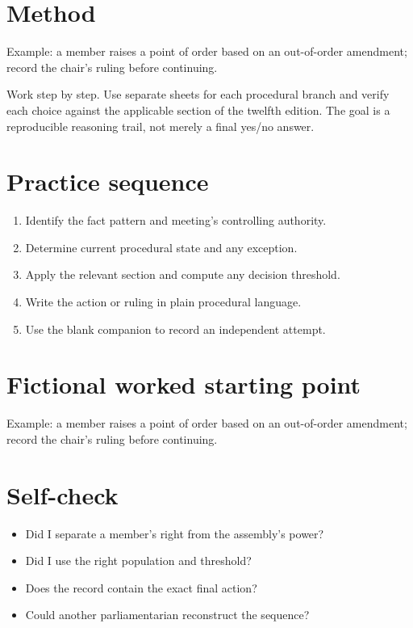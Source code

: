\documentclass[11pt]{article}
\begin{document}
\SuiteOpen
\section{Method}
Example: a member raises a point of order based on an out-of-order amendment; record the chair’s ruling before continuing.

Work step by step. Use separate sheets for each procedural branch and verify each choice against the applicable section of the twelfth edition. The goal is a reproducible reasoning trail, not merely a final yes/no answer.

\section{Practice sequence}
\begin{enumerate}[leftmargin=*,itemsep=4pt]
\item Identify the fact pattern and meeting’s controlling authority.
\item Determine current procedural state and any exception.
\item Apply the relevant section and compute any decision threshold.
\item Write the action or ruling in plain procedural language.
\item Use the blank companion to record an independent attempt.
\end{enumerate}

\section{Fictional worked starting point}
Example: a member raises a point of order based on an out-of-order amendment; record the chair’s ruling before continuing.

\section{Self-check}
\begin{itemize}[leftmargin=*,itemsep=4pt]
\item Did I separate a member’s right from the assembly’s power?
\item Did I use the right population and threshold?
\item Does the record contain the exact final action?
\item Could another parliamentarian reconstruct the sequence?
\end{itemize}
\end{document}
